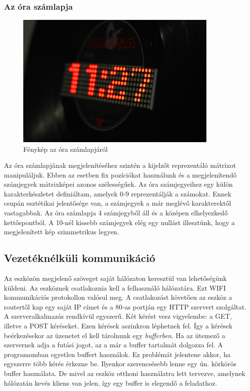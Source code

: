 \documentclass[a4paper, 12pt]{article}
\begin{document}
\subsubsection{Az óra számlapja}

\begin{figure}[ht]
	\centering
	\includegraphics[width = 10cm]{images/clockface.JPG}
	\caption{Fénykép az óra számlapjáról}
	\label{fig:clockface}
\end{figure}	

Az óra számlapjának megjelenítéséhez szintén a kijelzőt reprezentáló mátrixot manipuláljuk.
Ebben az esetben fix pozíciókat használunk és a megjelenítendő számjegyek mátrixképei azonos szélességűek.
Az óra számjegyeihez egy külön karakterkészletet definiáltam, amelyek 0-9 reprezentálják a számokat. Ennek csupán esztétikai jelentősége van, a számjegyek a már meglévő karakterektől vastagabbak.
Az óra számlapja 4 számjegyből áll és a középen elhelyezkedő kettőspontból.
A 10-nél kissebb számjegyek elég egy nullást illesztünk, hogy a megjelenített kép szimmetrikus legyen.

\subsection{Vezetéknélküli kommunikáció}
Az eszközön megjelenő szöveget saját hálózaton keresztül van lehetőségünk küldeni. Az eszköznek csatlakoznia kell a felhasználó hálózatára. Ezt WIFI kommunikációs protokollon valósul meg. A csatlakozást követően az eszköz a routertől kap egy saját IP címet és a 80-as portján egy HTTP szervert szolgáltat.
A szerveralkalmazás rendkívül egyszerű. Két kérést vesz vigyelembe: a GET, illetve a POST kéréseket.
Ezen kérések aszinkron léphetnek fel. Így a kérések beérkezésekor az üzenetet el kell tárolnunk egy \textit{bufferben}. Ha az ütemező a szervernek adja a futási jogot, az a már a buffer tartalmát dolgozza fel.
A programomban egyetlen buffert használok. Ez problémát jelentene akkor, ha egyszerre több kérés érkezne be. Ilyenkor szerencsésebb lenne egy ún. körkörös buffer használata. De mivel az eszköz otthoni használatra lett tervezve, amelynek hálózatán kevés kliens van jelen, így egy buffer is elegendő a feladathoz.
\end{document}
